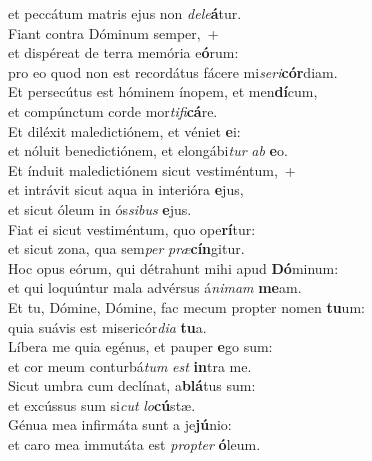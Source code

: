 \oddverse et peccátum matris ejus non \textit{de}\textit{le}\textbf{á}tur.\\
\evenverse Fiant contra Dóminum semper,~+\\
\evenverse  et dispéreat de terra memória e\textbf{ó}rum:~\*\\
\evenverse pro eo quod non est recordátus fácere mi\textit{se}\textit{ri}\textbf{cór}diam.\\
\oddverse Et persecútus est hóminem ínopem, et men\textbf{dí}cum,~\*\\
\oddverse et compúnctum corde mor\textit{ti}\textit{fi}\textbf{cá}re.\\
\evenverse Et diléxit maledictiónem, et véniet \textbf{e}i:~\*\\
\evenverse et nóluit benedictiónem, et elongábi\textit{tur} \textit{ab} \textbf{e}o.\\
\oddverse Et índuit maledictiónem sicut vestiméntum,~+\\
\oddverse  et intrávit sicut aqua in interióra \textbf{e}jus,~\*\\
\oddverse et sicut óleum in ós\textit{si}\textit{bus} \textbf{e}jus.\\
\evenverse Fiat ei sicut vestiméntum, quo ope\textbf{rí}tur:~\*\\
\evenverse et sicut zona, qua sem\textit{per} \textit{præ}\textbf{cín}gitur.\\
\oddverse Hoc opus eórum, qui détrahunt mihi apud \textbf{Dó}minum:~\*\\
\oddverse et qui loquúntur mala advérsus á\textit{ni}\textit{mam} \textbf{me}am.\\
\evenverse Et tu, Dómine, Dómine, fac mecum propter nomen \textbf{tu}um:~\*\\
\evenverse quia suávis est misericór\textit{di}\textit{a} \textbf{tu}a.\\
\oddverse Líbera me quia egénus, et pauper \textbf{e}go sum:~\*\\
\oddverse et cor meum conturbá\textit{tum} \textit{est} \textbf{in}tra me.\\
\evenverse Sicut umbra cum declínat, a\textbf{blá}tus sum:~\*\\
\evenverse et excússus sum si\textit{cut} \textit{lo}\textbf{cú}stæ.\\
\oddverse Génua mea infirmáta sunt a je\textbf{jú}nio:~\*\\
\oddverse et caro mea immutáta est \textit{prop}\textit{ter} \textbf{ó}leum.\\
